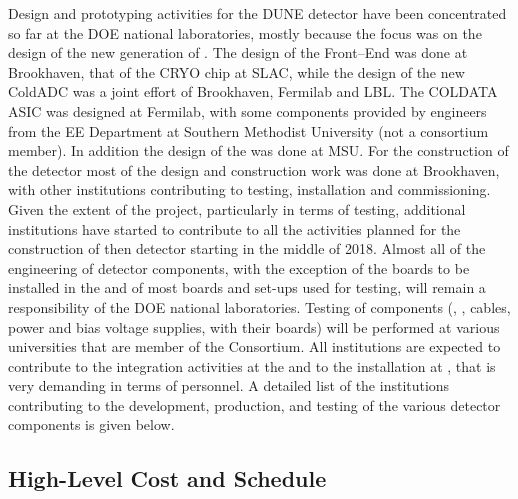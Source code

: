 Design and prototyping activities for the  DUNE detector have 
been concentrated so far at the DOE national laboratories, mostly
because the focus was on the design of the new generation of 
. The design of the Front--End  was
done at Brookhaven, that of the CRYO chip at SLAC, while the
design of the new ColdADC was a joint effort of Brookhaven,
Fermilab and LBL. The COLDATA ASIC was designed at Fermilab, with
some components provided by engineers from the EE Department
at Southern Methodist University (not a consortium member).
In addition the design of the  was done at MSU.
For the construction of the  detector most of the
design and construction work was done at Brookhaven, with other
institutions contributing to testing, installation and
commissioning. Given the extent of the project, particularly in
terms of testing, additional institutions have started to contribute
to all the activities planned for the construction of then 
 detector starting in the middle of 2018. Almost all
of the engineering of detector components, with the exception
of the boards to be installed in the  and of
most boards and set-ups used for testing, will remain a responsibility
of the DOE national laboratories. Testing of components
(, , cables, power and bias voltage supplies,
 with their boards) will be performed at various
universities that are member of the Consortium. All institutions
are expected to contribute to the integration activities at
the  and to the installation at \surf, that is very
demanding in terms of personnel. A detailed list of the 
institutions contributing to the development, production, and
testing of the various detector components is given below.

\subsection{High-Level Cost and Schedule}
\label{sec:fdsp-tpcelec-management-cost}


